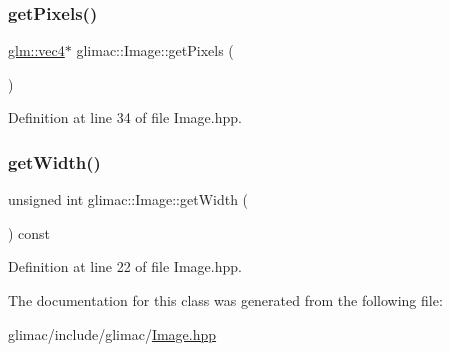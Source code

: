 \subsubsection{\texorpdfstring{get\+Pixels()}{getPixels()}\hspace{0.1cm}{\footnotesize\ttfamily [2/2]}}
{\footnotesize\ttfamily \hyperlink{group__core__types_ga5881b1b022d7fd1b7218f5916532dd02}{glm\+::vec4}$\ast$ glimac\+::\+Image\+::get\+Pixels (\begin{DoxyParamCaption}{ }\end{DoxyParamCaption})\hspace{0.3cm}{\ttfamily [inline]}}



Definition at line 34 of file Image.\+hpp.

\mbox{\label{classglimac_1_1_image_a23bc966575ee67b85fc575631b035026}} 
\subsubsection{\texorpdfstring{get\+Width()}{getWidth()}}
{\footnotesize\ttfamily unsigned int glimac\+::\+Image\+::get\+Width (\begin{DoxyParamCaption}{ }\end{DoxyParamCaption}) const\hspace{0.3cm}{\ttfamily [inline]}}



Definition at line 22 of file Image.\+hpp.



The documentation for this class was generated from the following file\+:\begin{DoxyCompactItemize}
\item 
glimac/include/glimac/\hyperlink{_image_8hpp}{Image.\+hpp}\end{DoxyCompactItemize}
